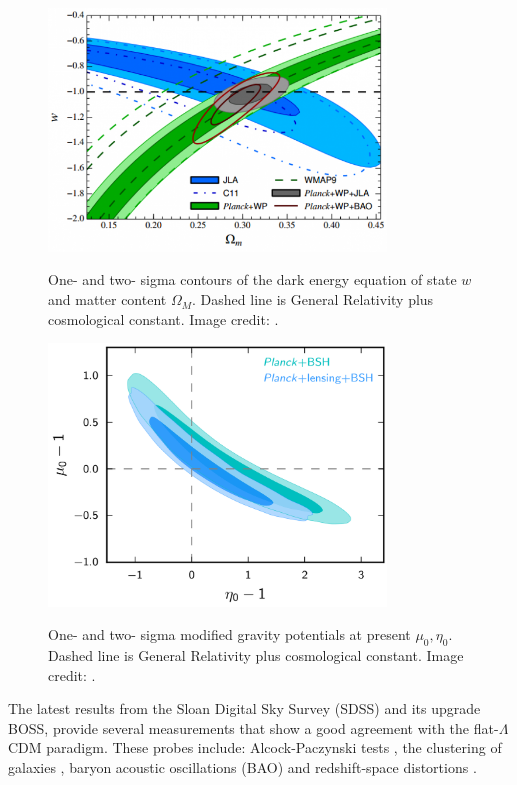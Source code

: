 \begin{figure}
\begin{center}
\includegraphics[width=0.8\textwidth]{./Pictures/JLA_w.png}
\caption{One- and two- sigma contours of the dark energy equation of state $w$ and matter content $\Omega_M$. Dashed line is General Relativity plus cosmological constant. Image credit: \cite{2014A&A...568A..22B}.}
\label{fig:jlaw0}
\vspace*{0.2cm}
\includegraphics[width=0.8\textwidth]{./Pictures/mg_planck2015.png}
\caption{One- and two- sigma modified gravity potentials at present $\mu_0,\eta_0$. Dashed line is General Relativity plus cosmological constant. Image credit: \cite{2016A&A...594A..14P}.}
\label{fig:mg_planck2015}
\end{center}
\end{figure}
The latest results from the Sloan Digital Sky Survey (SDSS) and its upgrade BOSS, provide several measurements that show a good agreement with the flat-$\Lambda$CDM paradigm. These probes include: Alcock-Paczynski tests \cite{2016ApJ...832..103L}, the clustering of galaxies \cite{2016arXiv160703155A}, baryon acoustic oscillations (BAO) \cite{2016arXiv160703154W,2017arXiv170200176B,Ata:2017dya} and redshift-space distortions \cite{2017MNRAS.465.1757G}.
\newline

